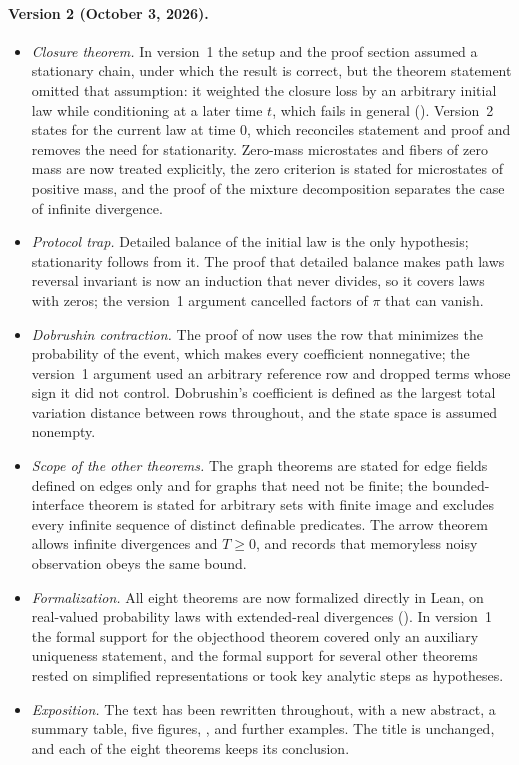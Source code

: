 \documentclass[11pt]{article}
\theoremstyle{definition}
\newcommand{\1}{\mathbf{1}}
\newcommand{\thmNGMacroClosureDeficit}{\Cref{thm:NG_MACRO_CLOSURE_DEFICIT}}
\begin{document}
\paragraph{Version 2 (October 3, 2026).}
\begin{itemize}[leftmargin=*]
  \item \emph{Closure theorem.} In version~1 the setup and the proof section assumed a stationary chain, under which the result is correct, but the theorem statement omitted that assumption: it weighted the closure loss by an arbitrary initial law while conditioning at a later time $t$, which fails in general (). Version~2 states \thmNGMacroClosureDeficit{} for the current law at time $0$, which reconciles statement and proof and removes the need for stationarity. Zero-mass microstates and fibers of zero mass are now treated explicitly, the zero criterion is stated for microstates of positive mass, and the proof of the mixture decomposition separates the case of infinite divergence.
  \item \emph{Protocol trap.} Detailed balance of the initial law is the only hypothesis; stationarity follows from it. The proof that detailed balance makes path laws reversal invariant is now an induction that never divides, so it covers laws with zeros; the version~1 argument cancelled factors of $\pi$ that can vanish.
  \item \emph{Dobrushin contraction.} The proof of  now uses the row that minimizes the probability of the event, which makes every coefficient nonnegative; the version~1 argument used an arbitrary reference row and dropped terms whose sign it did not control. Dobrushin's coefficient is defined as the largest total variation distance between rows throughout, and the state space is assumed nonempty.
  \item \emph{Scope of the other theorems.} The graph theorems are stated for edge fields defined on edges only and for graphs that need not be finite; the bounded-interface theorem is stated for arbitrary sets with finite image and excludes every infinite sequence of distinct definable predicates. The arrow theorem allows infinite divergences and $T\ge 0$, and  records that memoryless noisy observation obeys the same bound.
  \item \emph{Formalization.} All eight theorems are now formalized directly in Lean, on real-valued probability laws with extended-real divergences (). In version~1 the formal support for the objecthood theorem covered only an auxiliary uniqueness statement, and the formal support for several other theorems rested on simplified representations or took key analytic steps as hypotheses.
  \item \emph{Exposition.} The text has been rewritten throughout, with a new abstract, a summary table, five figures, , and further examples. The title is unchanged, and each of the eight theorems keeps its conclusion.
\end{itemize}
\end{document}
